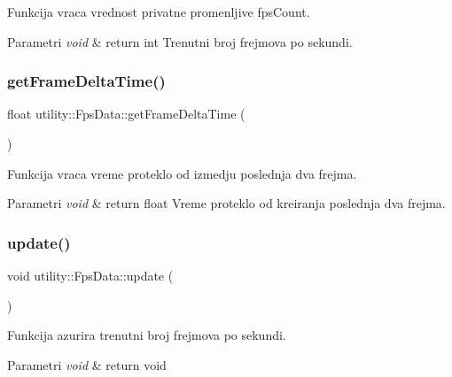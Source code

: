 Funkcija vraca vrednost privatne promenljive fps\+Count. 


\begin{DoxyParams}{Parametri}
{\em void} & return int Trenutni broj frejmova po sekundi. \\
\hline
\end{DoxyParams}
\mbox{\label{classutility_1_1FpsData_afe3b4f2272afb4efcc628a5947cf5383}} 
\subsubsection{\texorpdfstring{get\+Frame\+Delta\+Time()}{getFrameDeltaTime()}}
{\footnotesize\ttfamily float utility\+::\+Fps\+Data\+::get\+Frame\+Delta\+Time (\begin{DoxyParamCaption}{ }\end{DoxyParamCaption})}



Funkcija vraca vreme proteklo od izmedju poslednja dva frejma. 


\begin{DoxyParams}{Parametri}
{\em void} & return float Vreme proteklo od kreiranja poslednja dva frejma. \\
\hline
\end{DoxyParams}
\mbox{\label{classutility_1_1FpsData_adcc115a219b00aa4d0c979955b617f91}} 
\subsubsection{\texorpdfstring{update()}{update()}}
{\footnotesize\ttfamily void utility\+::\+Fps\+Data\+::update (\begin{DoxyParamCaption}{ }\end{DoxyParamCaption})}



Funkcija azurira trenutni broj frejmova po sekundi. 


\begin{DoxyParams}{Parametri}
{\em void} & return void \\
\hline
\end{DoxyParams}


